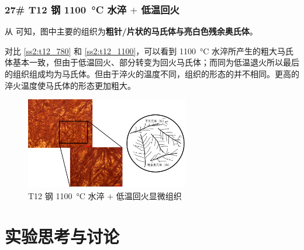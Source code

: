 \documentclass[a4paper,utf8]{article}
\begin{document}
        \subsubsection{27# T12 钢 \SI{1100}{\degreeCelsius} 水淬 $+$ 低温回火\label{ss2:t12_1100}}
            从 可知，图中主要的组织为\textbf{粗针/片状的马氏体与亮白色残余奥氏体}。\par
            对比 \ref{ss2:t12_780} 和 \ref{ss2:t12_1100}，可以看到 \SI{1100}{\degreeCelsius} 水淬所产生的粗大马氏体基本一致，但由于低温回火、部分转变为回火马氏体；而同为低温退火所以最后的组织组成均为马氏体。但由于淬火的温度不同，组织的形态的并不相同。更高的淬火温度使马氏体的形态更加粗大。
            \begin{figure}[!ht]
                \includegraphics[height=40mm]{result/14.pdf}
                \caption{T12 钢 \SI{1100}{\degreeCelsius} 水淬 $+$ 低温回火显微组织\label{fig:14}}
            \end{figure}
\section{实验思考与讨论}
\end{document}
